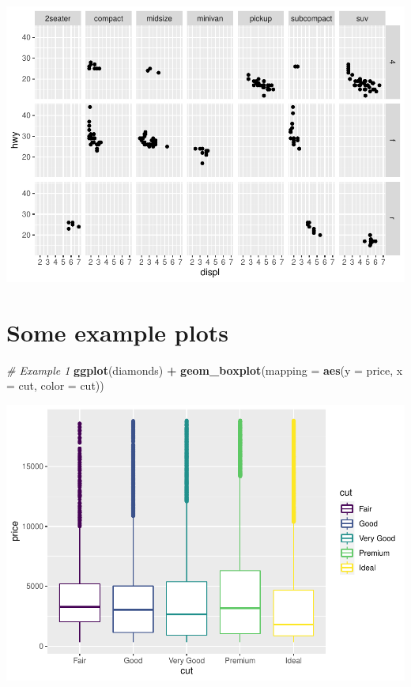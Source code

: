 \documentclass[
]{book}
\newenvironment{Shaded}{\begin{snugshade}}{\end{snugshade}}
\newcommand{\CommentTok}[1]{\textcolor[rgb]{0.56,0.35,0.01}{\textit{#1}}}
\newcommand{\DataTypeTok}[1]{\textcolor[rgb]{0.13,0.29,0.53}{#1}}
\newcommand{\KeywordTok}[1]{\textcolor[rgb]{0.13,0.29,0.53}{\textbf{#1}}}
\newcommand{\NormalTok}[1]{#1}
\newcommand{\OperatorTok}[1]{\textcolor[rgb]{0.81,0.36,0.00}{\textbf{#1}}}
\newcommand{\StringTok}[1]{\textcolor[rgb]{0.31,0.60,0.02}{#1}}
\begin{document}
\includegraphics{_main_files/figure-latex/unnamed-chunk-318-2.pdf}

\hypertarget{some-example-plots}{%
\section{Some example plots}\label{some-example-plots}}

\begin{Shaded}
\begin{Highlighting}[]
\CommentTok{# Example 1}
\KeywordTok{ggplot}\NormalTok{(diamonds) }\OperatorTok{+}\StringTok{ }\KeywordTok{geom_boxplot}\NormalTok{(}\DataTypeTok{mapping =} \KeywordTok{aes}\NormalTok{(}\DataTypeTok{y =}\NormalTok{ price, }\DataTypeTok{x =}\NormalTok{ cut,}
    \DataTypeTok{color =}\NormalTok{ cut))}
\end{Highlighting}
\end{Shaded}

\includegraphics{_main_files/figure-latex/unnamed-chunk-319-1.pdf}
\end{document}
